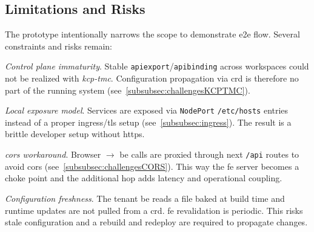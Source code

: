 \documentclass[11pt, a4paper, oneside, listof=totoc]{scrartcl}
\begin{document}
        \subsection{Limitations and Risks}\label{subsec:limitationsAndRisks}
            The prototype intentionally narrows the scope to demonstrate \gls{e2e} flow.
            Several constraints and risks remain:
            \begin{enumerate}[label={[\arabic*]:},
                    ref=Challenge~\arabic*,
                    leftmargin=*,
                    itemsep=0.6\baselineskip]

                    \item\label{chal:controlPlaneImmaturity}
                        \textit{Control plane immaturity}.
                        Stable \texttt{\gls{apiexport}}/\texttt{\gls{apibinding}} across workspaces could not be
                        realized with \emph{\gls{kcp}-\gls{tmc}}.
                        Configuration propagation via \gls{crd} is therefore no part of the running
                        system (see~\autoref{subsubsec:challengesKCPTMC}).

                    \item\label{chal:localExposureModel}
                        \textit{Local exposure model}.
                        Services are exposed via \texttt{NodePort} \texttt{/etc/hosts} entries
                        instead of a proper \gls{ingress}/\gls{tls} setup
                        (see~\autoref{subsubsec:ingress}).
                        The result is a brittle developer setup without \gls{https}.

                    \item\label{chal:corsWorkaround}
                        \textit{\gls{cors} workaround}.
                        Browser $\rightarrow$ \gls{be} calls are proxied through \gls{next}
                        \texttt{/api} routes to avoid \gls{cors}
                        (see~\autoref{subsubsec:challengesCORS}).
                        This way the \gls{fe} server becomes a choke point and the additional hop
                        adds latency and operational coupling.

                    \item\label{chal:configFreshness}
                        \textit{Configuration freshness}.
                        The tenant \gls{be} reads a file baked at build time and runtime updates are
                        not pulled from a \gls{crd}.
                        \gls{fe} revalidation is periodic.
                        This risks stale configuration and a rebuild and redeploy are required to
                        propagate changes.


\end{enumerate}
\end{document}
